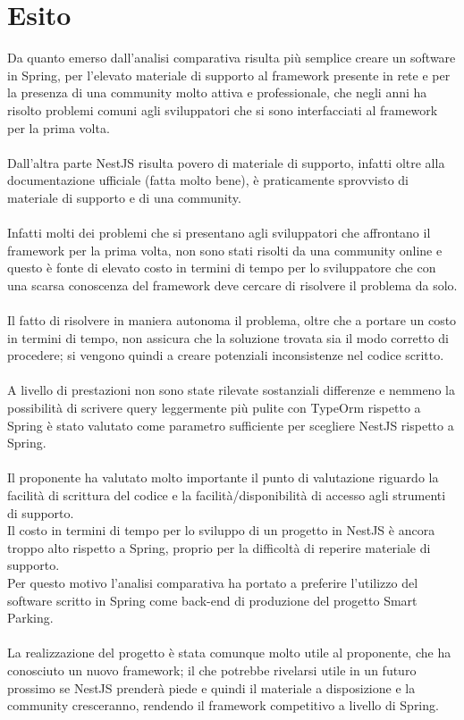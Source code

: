 \section{Esito}
Da quanto emerso dall'analisi comparativa risulta più semplice creare un software in Spring, per l'elevato materiale di
supporto al framework presente in rete e per la presenza di una community molto attiva e professionale, che negli
anni ha risolto problemi comuni agli sviluppatori che si sono interfacciati al framework per la prima volta. 
\\\\
Dall'altra parte NestJS risulta povero di materiale di supporto, infatti oltre alla documentazione ufficiale (fatta molto
bene), è praticamente sprovvisto di materiale di supporto e di una community.
\\\\
Infatti molti dei problemi che si presentano agli sviluppatori che affrontano il framework per la prima volta, non sono
stati risolti da una community online e questo è fonte di elevato costo in termini di tempo per lo sviluppatore che con 
una scarsa conoscenza del framework deve cercare di risolvere il problema da solo.
\\\\
Il fatto di risolvere in maniera autonoma il problema, oltre che a portare un costo in termini di tempo, non assicura 
che la soluzione trovata sia il modo corretto di procedere; si vengono quindi a creare potenziali inconsistenze nel codice
scritto.
\\\\
A livello di prestazioni non sono state rilevate sostanziali differenze e nemmeno la possibilità di scrivere query 
leggermente più pulite con TypeOrm rispetto a Spring è stato valutato come parametro sufficiente per scegliere 
NestJS rispetto a Spring.
\\\\
Il proponente ha valutato molto importante il punto di valutazione riguardo la facilità di scrittura del codice
e la facilità/disponibilità di accesso agli strumenti di supporto.
\\
Il costo in termini di tempo per lo sviluppo di un progetto in NestJS è ancora troppo alto rispetto a Spring, proprio
per la difficoltà di reperire materiale di supporto.
\\
Per questo motivo l'analisi comparativa ha portato a preferire l'utilizzo del software scritto in Spring come \gls{back-end}
di produzione del progetto Smart Parking.
\\\\
La realizzazione del progetto è stata comunque molto utile al proponente, che ha conosciuto un nuovo
framework; il che potrebbe rivelarsi utile in un futuro prossimo se NestJS prenderà piede e quindi il materiale a 
disposizione e la community cresceranno, rendendo il framework competitivo a livello di Spring.